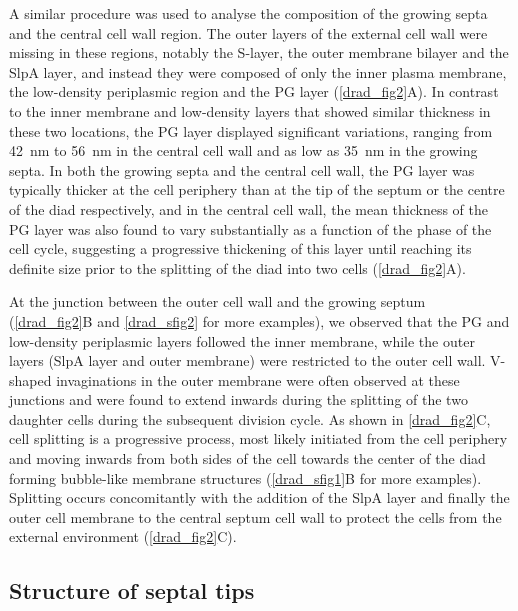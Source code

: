 A similar procedure was used to analyse the composition of the growing septa and the central cell wall region.
The outer layers of the external cell wall were missing in these regions, notably the S-layer, the outer membrane bilayer and the SlpA layer, and instead they were composed of only the inner plasma membrane, the low-density periplasmic region and the PG layer (\autoref{drad_fig2}A).
In contrast to the inner membrane and low-density layers that showed similar thickness in these two locations, the PG layer displayed significant variations, ranging from \qty{42}{nm} to \qty{56}{nm} in the central cell wall and as low as \qty{35}{nm} in the growing septa.
In both the growing septa and the central cell wall, the PG layer was typically thicker at the cell periphery than at the tip of the septum or the centre of the diad respectively, and in the central cell wall, the mean thickness of the PG layer was also found to vary substantially as a function of the phase of the cell cycle, suggesting a progressive thickening of this layer until reaching its definite size prior to the splitting of the diad into two cells (\autoref{drad_fig2}A).

At the junction between the outer cell wall and the growing septum (\autoref{drad_fig2}B and \autoref{drad_sfig2} for more examples), we observed that the PG and low-density periplasmic layers followed the inner membrane, while the outer layers (SlpA layer and outer membrane) were restricted to the outer cell wall.
V-shaped invaginations in the outer membrane were often observed at these junctions and were found to extend inwards during the splitting of the two daughter cells during the subsequent division cycle.
As shown in \autoref{drad_fig2}C, cell splitting is a progressive process, most likely initiated from the cell periphery and moving inwards from both sides of the cell towards the center of the diad forming bubble-like membrane structures (\autoref{drad_sfig1}B for more examples).
Splitting occurs concomitantly with the addition of the SlpA layer and finally the outer cell membrane to the central septum cell wall to protect the cells from the external environment (\autoref{drad_fig2}C).

\FloatBarrier

\subsection{Structure of septal tips}

